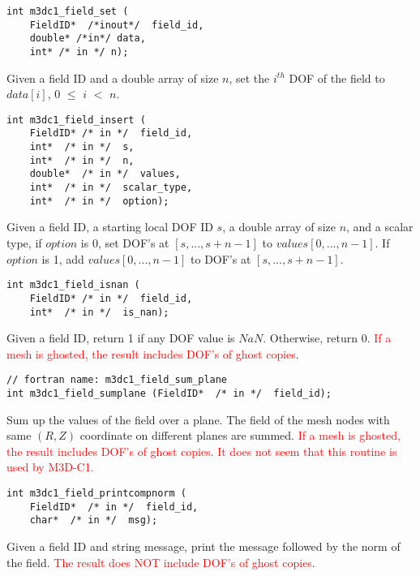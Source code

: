 \begin{verbatim}
int m3dc1_field_set (
    FieldID*  /*inout*/  field_id, 
    double* /*in*/ data, 
    int* /* in */ n);
\end{verbatim}\vspace{-.5cm}\hspace{1cm}
Given a field ID and a double array of size $n$, set the $i^{th}$ DOF of the field to $data[i]$, $0$ $\le$ $i$ $<$ $n$. 

\begin{verbatim}
int m3dc1_field_insert ( 
    FieldID* /* in */  field_id, 
    int*  /* in */  s, 
    int*  /* in */  n, 
    double*  /* in */  values, 
    int*  /* in */  scalar_type, 
    int*  /* in */  option);
\end{verbatim}\vspace{-.5cm}\hspace{1cm}
Given a field ID, a starting local DOF ID $s$, a double array of size $n$, and a scalar type, if $option$ is 0, set DOF's at $[s,...,s+n-1]$ to $values[0,...,n-1]$. If $option$ is 1, add $values[0,...,n-1]$ to DOF's at $[s,...,s+n-1]$.

\begin{verbatim}
int m3dc1_field_isnan (
    FieldID* /* in */  field_id, 
    int*  /* in */  is_nan);
\end{verbatim}\vspace{-.5cm}\hspace{1cm}
Given a field ID, return 1 if any DOF value is $NaN$. Otherwise, return 0. \textcolor{red}{If a mesh is ghosted, the result includes DOF's of ghost copies}.

\begin{verbatim}
// fortran name: m3dc1_field_sum_plane
int m3dc1_field_sumplane (FieldID*  /* in */  field_id);
\end{verbatim}\vspace{-.5cm}\hspace{1cm}
Sum up the values of the field over a plane. The field of the mesh nodes with same $(R,Z)$ coordinate on different planes are summed. \textcolor{red}{If a mesh is ghosted, the result includes DOF's of ghost copies. It does not seem that this routine is used by M3D-C1.}

\begin{verbatim}
int m3dc1_field_printcompnorm (
    FieldID*  /* in */  field_id, 
    char*  /* in */  msg);
\end{verbatim}\vspace{-.5cm}\hspace{1cm}
Given a field ID and string message, print the message followed by the norm of the field. \textcolor{red}{The result does NOT include DOF's of ghost copies}.

